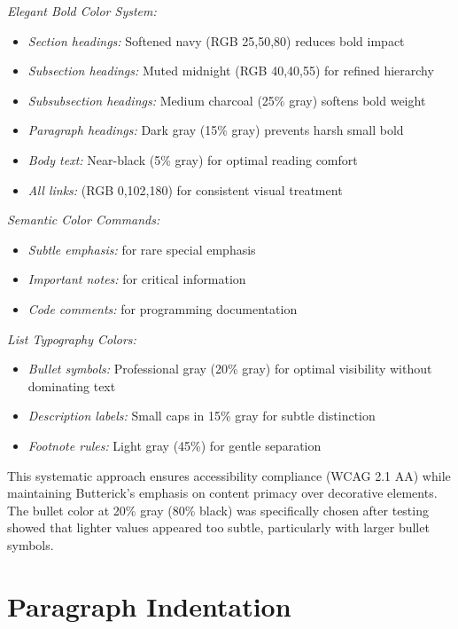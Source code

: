 \documentclass[11pt]{article}
\begin{document}
\emph{Elegant Bold Color System:}
\begin{itemize}
\item \emph{Section headings:} \textcolor{sectioncolor}{Softened navy} (RGB 25,50,80) reduces bold impact
\item \emph{Subsection headings:} \textcolor{subsectioncolor}{Muted midnight} (RGB 40,40,55) for refined hierarchy
\item \emph{Subsubsection headings:} \textcolor{subsubcolor}{Medium charcoal} (25\% gray) softens bold weight
\item \emph{Paragraph headings:} \textcolor{paragraphcolor}{Dark gray} (15\% gray) prevents harsh small bold
\item \emph{Body text:} \textcolor{textblack}{Near-black (5\% gray)} for optimal reading comfort
\item \emph{All links:}  (RGB 0,102,180) for consistent visual treatment
\end{itemize}

\emph{Semantic Color Commands:}
\begin{itemize}
\item \emph{Subtle emphasis:}  for rare special emphasis
\item \emph{Important notes:}  for critical information
\item \emph{Code comments:}  for programming documentation
\end{itemize}

\emph{List Typography Colors:}
\begin{itemize}
\item \emph{Bullet symbols:} Professional gray (20\% gray) for optimal visibility without dominating text
\item \emph{Description labels:} Small caps in 15\% gray for subtle distinction
\item \emph{Footnote rules:} Light gray (45\%) for gentle separation
\end{itemize}

This systematic approach ensures accessibility compliance (WCAG 2.1 AA) while maintaining Butterick's emphasis on content primacy over decorative elements. The bullet color at 20\% gray (80\% black) was specifically chosen after testing showed that lighter values appeared too subtle, particularly with larger bullet symbols.

\section{Paragraph Indentation}
\end{document}
